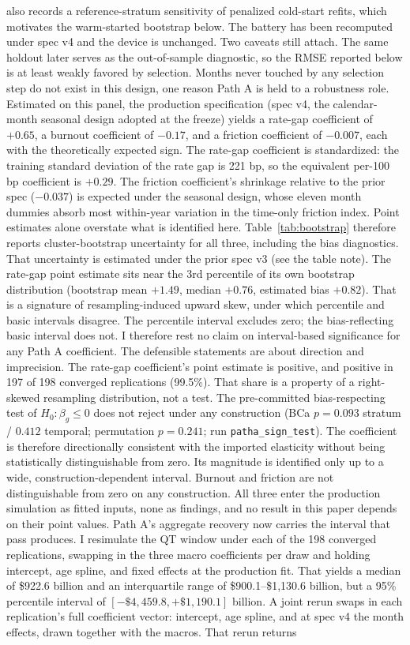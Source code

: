 \documentclass[12pt]{article}
\begin{document}
also records a reference-stratum sensitivity of penalized cold-start refits, which motivates the warm-started bootstrap below. The battery has been recomputed under spec v4 and the device is unchanged. Two caveats still attach. The same holdout later serves as the out-of-sample diagnostic, so the RMSE reported below is at least weakly favored by selection. Months never touched by any selection step do not exist in this design, one reason Path A is held to a robustness role.
Estimated on this panel, the production specification (spec v4, the calendar-month seasonal design adopted at the freeze) yields a rate-gap coefficient of $+0.65$, a burnout coefficient of $-0.17$, and a friction coefficient of $-0.007$, each with the theoretically expected sign. The rate-gap coefficient is standardized: the training standard deviation of the rate gap is 221 bp, so the equivalent per-100 bp coefficient is $+0.29$. The friction coefficient's shrinkage relative to the prior spec ($-0.037$) is expected under the seasonal design, whose eleven month dummies absorb most within-year variation in the time-only friction index. Point estimates alone overstate what is identified here. Table~\ref{tab:bootstrap} therefore reports cluster-bootstrap uncertainty for all three, including the bias diagnostics. That uncertainty is estimated under the prior spec v3 (see the table note). The rate-gap point estimate sits near the 3rd percentile of its own bootstrap distribution (bootstrap mean $+1.49$, median $+0.76$, estimated bias $+0.82$). That is a signature of resampling-induced upward skew, under which percentile and basic intervals disagree. The percentile interval excludes zero; the bias-reflecting basic interval does not. I therefore rest no claim on interval-based significance for any Path A coefficient. The defensible statements are about direction and imprecision. The rate-gap coefficient's point estimate is positive, and positive in 197 of 198 converged replications (99.5\%). That share is a property of a right-skewed resampling distribution, not a test. The pre-committed bias-respecting test of $H_0\!: \beta_g \le 0$ does not reject under any construction (BCa $p = 0.093$ stratum / $0.412$ temporal; permutation $p = 0.241$; run \texttt{patha\_sign\_test}). The coefficient is therefore directionally consistent with the imported elasticity without being statistically distinguishable from zero. Its magnitude is identified only up to a wide, construction-dependent interval. Burnout and friction are not distinguishable from zero on any construction. All three enter the production simulation as fitted inputs, none as findings, and no result in this paper depends on their point values. Path A's aggregate recovery now carries the interval that pass produces. I resimulate the QT window under each of the 198 converged replications, swapping in the three macro coefficients per draw and holding intercept, age spline, and fixed effects at the production fit. That yields a median of \$922.6 billion and an interquartile range of \$900.1--\$1{,}130.6 billion, but a 95\% percentile interval of $[-\$4{,}459.8, +\$1{,}190.1]$ billion. A joint rerun swaps in each replication's full coefficient vector: intercept, age spline, and at spec v4 the month effects, drawn together with the macros. That rerun returns 
\end{document}
